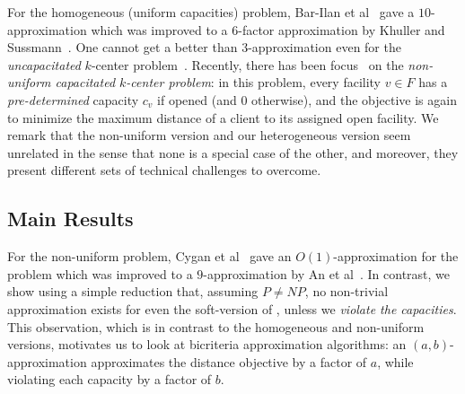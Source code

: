For the homogeneous (uniform capacities) problem, Bar-Ilan et al~\cite{Bar-IlanKP93} gave a $10$-approximation which was improved to a $6$-factor approximation by Khuller and Sussmann~\cite{KhullerS00}. One cannot get a better than $3$-approximation even for the {\em uncapacitated} $k$-center problem~\cite{HochbaumS85}. Recently, there has been focus~\cite{CyganHK12,AnBCGMS14} on the {\em non-uniform capacitated $k$-center problem}: in this problem, every facility $v\in F$ has a \emph{pre-determined} capacity $c_v$ if opened (and $0$ otherwise), and the objective is again to minimize the maximum distance of a client to its assigned open facility. We remark that the non-uniform version and our heterogeneous version seem unrelated in the sense that none is a special case of the other, and moreover, they present different sets of technical challenges to overcome.

\subsection{Main Results}

For the non-uniform problem, Cygan et al~\cite{CyganHK12} gave an $O(1)$-approximation for the problem which was improved to a $9$-approximation by An et al~\cite{AnBCGMS14}. In contrast, we show using a simple reduction that, assuming $P \neq NP$, no non-trivial approximation exists for even the soft-version of \mckc, unless we {\em violate the capacities}. This observation, which is in contrast to the homogeneous and non-uniform versions, motivates us to look at bicriteria approximation algorithms: an $(a,b)$-approximation approximates the distance objective by a factor of $a$, while violating each capacity by a factor of $b$.


